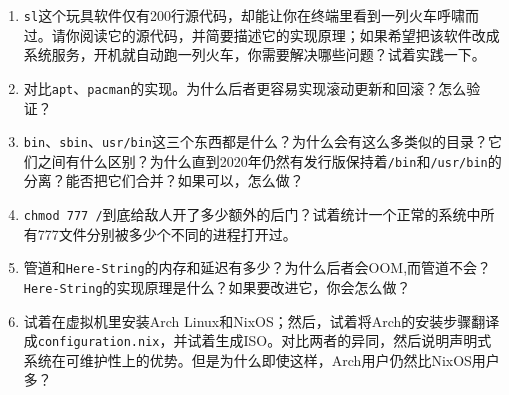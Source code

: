 \begin{thinking}
  \begin{enumerate}
    \item \texttt{sl}这个玩具软件仅有200行源代码，却能让你在终端里看到一列火车呼啸而过。请你阅读它的源代码，并简要描述它的实现原理；如果希望把该软件改成系统服务，开机就自动跑一列火车，你需要解决哪些问题？试着实践一下。
    \item 对比\texttt{apt}、\texttt{pacman}的实现。为什么后者更容易实现滚动更新和回滚？怎么验证？
    \item \texttt{bin}、\texttt{sbin}、\texttt{usr/bin}这三个东西都是什么？为什么会有这么多类似的目录？它们之间有什么区别？为什么直到2020年仍然有发行版保持着\texttt{/bin}和\texttt{/usr/bin}的分离？能否把它们合并？如果可以，怎么做？
    \item \texttt{chmod 777 /}到底给敌人开了多少额外的后门？试着统计一个正常的系统中所有777文件分别被多少个不同的进程打开过。
    \item 管道和\texttt{Here-String}的内存和延迟有多少？为什么后者会OOM,而管道不会？\texttt{Here-String}的实现原理是什么？如果要改进它，你会怎么做？
    \item 试着在虚拟机里安装Arch Linux和NixOS；然后，试着将Arch的安装步骤翻译成\texttt{configuration.nix}，并试着生成ISO。对比两者的异同，然后说明声明式系统在可维护性上的优势。但是为什么即使这样，Arch用户仍然比NixOS用户多？
  \end{enumerate}
\end{thinking}